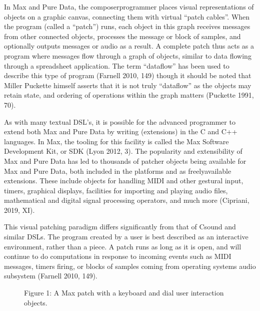 \documentclass[letterpaper,10pt,english]{sphinxmanual}
\begin{document}
\sphinxAtStartPar
In Max and Pure Data, the composer\sphinxhyphen{}programmer places visual representations of objects on a graphic canvas,
connecting them with virtual “patch cables”. When the program (called a “patch”) runs,
each object in this graph receives messages from other connected objects, processes the
message or block of samples, and optionally outputs messages or audio as a result.
A complete patch thus acts as a program where messages flow
through a graph of objects, similar to data flowing through a spreadsheet application.
The term “dataflow” has been used to describe this type of program (Farnell 2010, 149)
though it should be noted that Miller Puckette himself asserts that it is not
truly “dataflow” as the objects may retain state, and ordering of operations within the graph
matters (Puckette 1991, 70).

\sphinxAtStartPar
As with many textual DSL’s, it is possible for the advanced programmer to extend both Max
and Pure Data by writing  (extensions) in the C and C++ languages. In Max, the
tooling for this facility
is called the Max Software Development Kit, or SDK (Lyon 2012, 3).
The popularity and extensibility of Max and Pure Data has led to thousands
of patcher objects being available for Max and Pure Data, both included
in the platforms and as freely\sphinxhyphen{}available extensions. These include objects
for handling MIDI and other gestural input, timers, graphical displays,
facilities for importing and playing audio files, mathematical
and digital signal processing operators, and much more (Cipriani, 2019, XI).

\sphinxAtStartPar
This visual patching paradigm differs significantly from that of Csound and similar DSLs.
The program created by a user is best described as an interactive environment, rather than a piece.
A patch runs as long as it is open, and will continue to do computations in response to
incoming events such as MIDI messages, timers firing, or blocks of samples
coming from operating systems audio subsystem (Farnell 2010, 149).

\begin{figure}[htbp]
\centering
\capstart

\noindent{}
\caption{Figure 1: A Max patch with a keyboard and dial user interaction objects.}\label{\detokenize{background:id1}}\end{figure}
\end{document}
